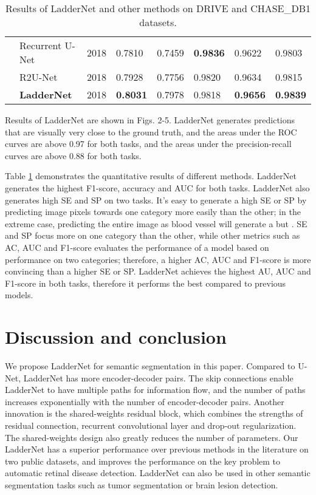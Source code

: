 \documentclass{article}
\begin{document}
\begin{table}[]
{\begin{tabular}{@{}|l|l|l|l|l|l|l|l|@{}}
                             & Recurrent U-Net  \cite{alom2018recurrent}  & 2018 & 0.7810          & 0.7459          & \textbf{0.9836} & 0.9622          & 0.9803          \\ \cmidrule(l){2-8} 
                             & R2U-Net   \cite{alom2018recurrent}         & 2018 & 0.7928          & 0.7756          & 0.9820          & 0.9634          & 0.9815          \\ \cmidrule(l){2-8} 
                             & \textbf{LadderNet}          & 2018 & \textbf{0.8031} & 0.7978          & 0.9818          & \textbf{0.9656} & \textbf{0.9839} \\ \bottomrule
\end{tabular}}

\caption{Results of LadderNet and other methods on DRIVE and CHASE\_DB1 datasets.}
\label{Table}
\end{table}

Results of LadderNet are shown in Figs. 2-5. LadderNet generates predictions that are visually very close to the ground truth, and the areas under the ROC curves are above 0.97 for both tasks, and the areas under the precision-recall curves are above 0.88 for both tasks.
\par
Table \ref{Table} demonstrates the quantitative results of different methods. LadderNet generates the highest F1-score, accuracy and AUC for both tasks. LadderNet also generates high SE and SP on two tasks. It's easy to generate a high SE or SP by predicting image pixels towards one category more easily than the other; in the extreme case, predicting the entire image as blood vessel will generate a  but . SE and SP focus more on one category than the other, while other metrics such as AC, AUC and F1-score evaluates the performance of a model based on performance on two categories; therefore, a higher AC, AUC and F1-score is more convincing than a higher SE or SP. LadderNet achieves the highest AU, AUC and F1-score in both tasks, therefore it performs the best compared to previous models.

\section{Discussion and conclusion}
We propose LadderNet for semantic segmentation in this paper. Compared to U-Net, LadderNet has more encoder-decoder pairs. The skip connections enable LadderNet to have multiple paths for information flow, and the number of paths increases exponentially with the number of encoder-decoder pairs. Another innovation is the shared-weights residual block, which combines the strengths of residual connection, recurrent convolutional layer and drop-out regularization. The shared-weights design also greatly reduces the number of parameters. Our LadderNet has a superior performance over previous methods in the literature on two public datasets, and improves the performance on the key problem to automatic retinal disease detection. LadderNet can also be used in other semantic segmentation tasks such as tumor segmentation or brain lesion detection.

\small{

}
\end{document}
